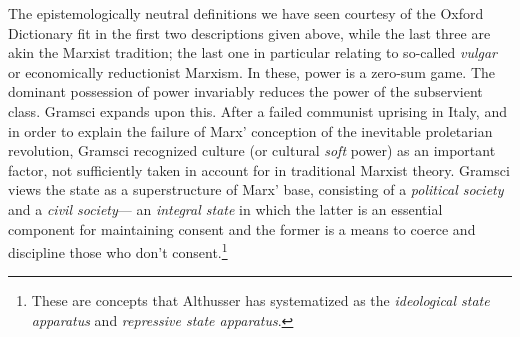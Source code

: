 \documentclass[10pt,british,A4paper,twoside]{memoir}
\begin{document}
The epistemologically neutral definitions we have seen courtesy of the
Oxford Dictionary fit in the first two descriptions given above, while
the last three are akin the Marxist tradition; the last one in
particular relating to so-called \emph{vulgar} or economically
reductionist Marxism. In these, power is a zero-sum game. The dominant
possession of power invariably reduces the power of the subservient
class. Gramsci expands upon this. After a failed communist uprising in
Italy, and in order to explain the failure of Marx' conception of the
inevitable proletarian revolution, Gramsci recognized culture (or
cultural \emph{soft} power) as an important factor, not sufficiently
taken in account for in traditional Marxist theory. Gramsci views the
state as a superstructure of Marx' base, consisting of a \emph{political
society} and a \emph{civil society}--- an \emph{integral state} in which
the latter is an essential component for maintaining consent and the
former is a means to coerce and discipline those who don't
consent.\footnote{These are concepts that Althusser has systematized as
  the \emph{ideological state apparatus} and \emph{repressive state
  apparatus}.}
\end{document}
